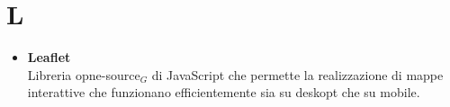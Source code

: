 \chapter{L} \label{L}
\begin{itemize}
	\item \textbf{Leaflet} \\
	Libreria opne-source$_G$ di JavaScript che permette la realizzazione di mappe interattive che funzionano efficientemente sia su deskopt che su mobile. 
\end{itemize}